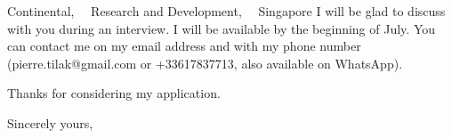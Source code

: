 \documentclass{scrlttr2}
\renewcommand{\\}{\ {\large\textperiodcentered}\ }
\begin{document}
\begin{letter}{ %
Continental,\\
Research and Development,\\
Singapore
}
I will be glad to discuss with you during an interview. I will be available by the beginning of July. You can contact me on my email address and with my phone
	number (pierre.tilak@gmail.com or +33617837713, also available on WhatsApp).

Thanks for considering my application.

%
%
%
%
Sincerely yours, \\ \\ \\


\end{letter}
\end{document}
